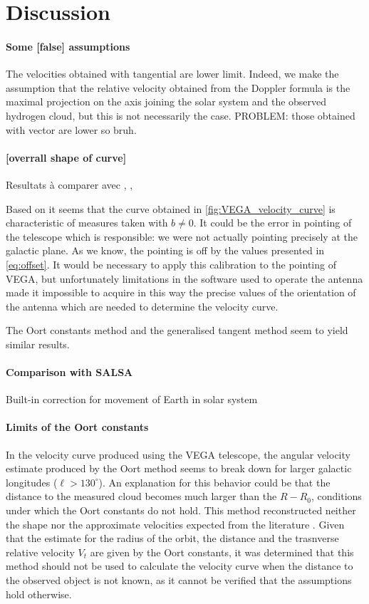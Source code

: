 \section{Discussion}
\paragraph{Some [false] assumptions}
The velocities obtained with tangential are lower limit.
Indeed, we make the assumption that the relative velocity obtained from the Doppler formula is the maximal projection on the axis joining the solar system and the observed hydrogen cloud, but this is not necessarily the case.
PROBLEM: those obtained with vector are lower so bruh.

\paragraph{[overrall shape of curve]}
Resultats à comparer avec \cite{ou_dark_2024}, \cite{jia_research_2022}, \cite{mroz_rotation_2019}

Based on \cite{sakhawat_hossain_salsa_2018} it seems that the curve obtained in \autoref{fig:VEGA_velocity_curve} is characteristic of measures taken with $b \neq 0$. It could be the error in pointing of the telescope which is responsible: we were not actually pointing precisely at the galactic plane. As we know, the pointing is off by the values presented in \autoref{eq:offset}.
It would be necessary to apply this calibration to the pointing of VEGA, but unfortunately limitations in the software used to operate the antenna made it  impossible to acquire in this way the precise values of the orientation of the antenna which are needed to determine the velocity curve.

The Oort constants method and the generalised tangent method seem to yield similar results.

\paragraph{Comparison with SALSA}
Built-in correction for movement of Earth in solar system

\paragraph{Limits of the Oort constants}
In the velocity curve produced using the VEGA telescope, the angular velocity estimate produced by the Oort method seems to break down for larger galactic longitudes ($\ell > 130^\circ$). An explanation for this behavior could be that the distance to the measured cloud becomes much larger than the $R-R_0$, conditions under which the Oort constants do not hold.
This method reconstructed neither the shape nor the approximate velocities expected from the literature \cite{mroz_rotation_2019}.
Given that the estimate for the radius of the orbit, the distance and the trasnverse relative velocity $V_t$ are given by the Oort constants, it was determined that this method should not be used to calculate the velocity curve when the distance to the observed object is not known, as it cannot be verified that the assumptions hold otherwise.

